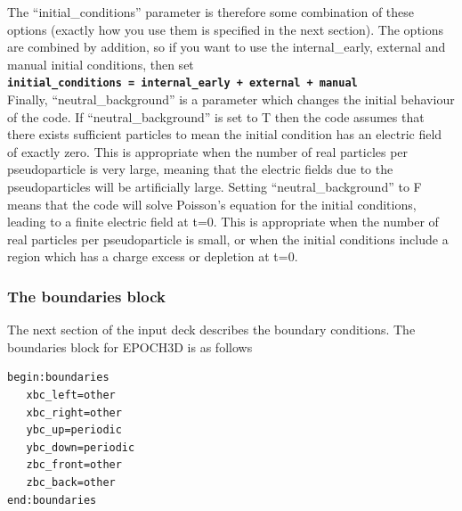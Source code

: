 \documentclass[12pt,a4paper]{article}
\newcommand{\simpleboxverbatim}{\begin{Verbatim}[obeytabs=true,frame=single,
  framerule=0.5mm,rulecolor=\color{warwickmid},formatcom=\color{black}]}
\newcommand{\inlinecode}[1]{{\color{warwickred} \bf\texttt{#1}}}
\begin{document}
The ``initial\_conditions'' parameter is therefore some combination of these
options (exactly how you use them is specified in the next section). The
options are combined by addition, so if you want to use the internal\_early,
external and manual initial conditions, then set\\
\inlinecode{initial\_conditions = internal\_early + external + manual}\\

Finally, ``neutral\_background'' is a parameter which changes the initial
behaviour of the code. If ``neutral\_background'' is set to T then the code
assumes that there exists sufficient particles to mean the initial condition
has an electric field of exactly zero. This is appropriate when the number of
real particles per pseudoparticle is very large, meaning that the electric
fields due to the pseudoparticles will be artificially large. Setting
``neutral\_background'' to F means that the code will solve Poisson's equation
for the initial conditions, leading to a finite electric field at t=0. This is
appropriate when the number of real particles per pseudoparticle is small, or
when the initial conditions include a region which has a charge excess or
depletion at t=0.\\

\subsubsection{The boundaries block}
The next section of the input deck describes the boundary conditions. The
boundaries block for EPOCH3D is as follows\\
\simpleboxverbatim
begin:boundaries
   xbc_left=other
   xbc_right=other
   ybc_up=periodic
   ybc_down=periodic
   zbc_front=other
   zbc_back=other
end:boundaries
\end{Verbatim}
\end{document}
